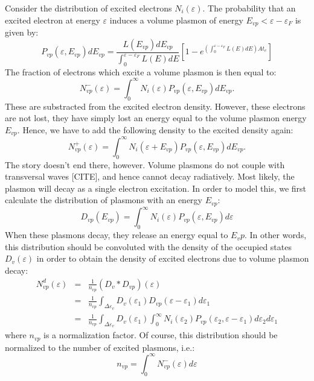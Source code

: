 \begin{refsection}
Consider the distribution of excited electrons $N_i(\varepsilon)$. The probability that an excited electron at energy $\varepsilon$ induces a volume plasmon of energy $E_{vp} < \varepsilon - \varepsilon_F$ is given by:
\begin{equation}
P_{vp}(\varepsilon, E_{vp}) dE_{vp} = \frac{L(E_{vp})dE_{vp}}{\int_0^{\varepsilon - \varepsilon_F} L(E) dE }\left[1-e^{\left(\int_0^{\varepsilon - \varepsilon_F} L(E) dE\right) A t_e }\right]
\end{equation}
The fraction of electrons which excite a volume plasmon is then equal to:
\begin{equation}
    N_{vp}^{-}(\varepsilon) = \int_0^\infty N_i(\varepsilon) P_{vp}(\varepsilon, E_{vp}) dE_{vp}.
\end{equation}
These are substracted from the excited electron density. However, these electrons are not lost, they have simply lost an energy equal to the volume plasmon energy $E_{vp}$. Hence, we have to add the following density to the excited density again:
\begin{equation}
    N_{vp}^{+}(\varepsilon) = \int_0^\infty N_i(\varepsilon + E_{vp}) P_{vp}(\varepsilon, E_{vp}) dE_{vp}.
\end{equation}
The story doesn't end there, however. Volume plasmons do not couple with transversal waves [CITE], and hence cannot decay radiatively. Most likely, the plasmon will decay as a single electron excitation. In order to model this, we first calculate the distribution of plasmons with an energy $E_{vp}$:
\begin{equation}
    D_{vp} (E_{vp})= \int_0^\infty N_i(\varepsilon) P_{vp}(\varepsilon, E_{vp}) d\varepsilon
\end{equation}
When these plasmons decay, they release an energy equal to $E_vp$. In other words, this distribution should be convoluted with the density of the occupied states $D_v(\varepsilon)$ in order to obtain the density of excited electrons due to volume plasmon decay:
\begin{eqnarray}
    N_{vp}^{d}(\varepsilon) &=& \frac{1}{n_{vp}}(D_v * D_{vp}) (\varepsilon) \\
    &=& \frac{1}{n_{vp}} \int_{\Delta\varepsilon_v} D_v(\varepsilon_1) D_{vp}(\varepsilon - \varepsilon_1) d\varepsilon_1 \\
    &=& \frac{1}{n_{vp}} \int_{\Delta\varepsilon_v} D_v(\varepsilon_1) 
    \int_0^\infty N_i(\varepsilon_2) P_{vp}(\varepsilon_2, \varepsilon - \varepsilon_1) d\varepsilon_2 d\varepsilon_1 
\end{eqnarray}
where $n_{vp}$ is a normalization factor. Of course, this distribution should be normalized to the number of excited plasmons, i.e.:
\begin{equation}
    n_{vp} = \int_0^\infty N_{vp}^{-}(\varepsilon) d\varepsilon
\end{equation}


\end{refsection}
